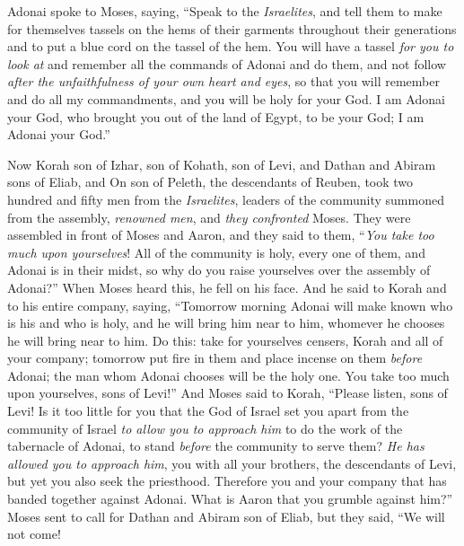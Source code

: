 \begin{biblechapter}
 Adonai spoke to Moses, saying,
\verse “Speak to the \textit{Israelites}, and tell them to make for themselves tassels on the hems of their garments throughout their generations and to put a blue cord on the tassel of the hem.
\verse You will have a tassel \textit{for you to look at} and remember all the commands of Adonai and do them, and not follow \textit{after the unfaithfulness of your own heart and eyes},
\verse so that you will remember and do all my commandments, and you will be holy for your God.
\verse I am Adonai your God, who brought you out of the land of Egypt, to be your God; I am Adonai your God.”
\end{biblechapter}

\begin{biblechapter} %
 Now Korah son of Izhar, son of Kohath, son of Levi, and Dathan and Abiram sons of Eliab, and On son of Peleth, the descendants of Reuben,
\verse took two hundred and fifty men from the \textit{Israelites}, leaders of the community summoned from the assembly, \textit{renowned men}, and \textit{they confronted} Moses.
\verse They were assembled in front of Moses and Aaron, and they said to them, “\textit{You take too much upon yourselves}! All of the community is holy, every one of them, and Adonai is in their midst, so why do you raise yourselves over the assembly of Adonai?”
\verse When Moses heard this, he fell on his face.
\verse And he said to Korah and to his entire company, saying, “Tomorrow morning Adonai will make known who is his and who is holy, and he will bring him near to him, whomever he chooses he will bring near to him.
\verse Do this: take for yourselves censers, Korah and all of your company;
\verse tomorrow put fire in them and place incense on them \textit{before} Adonai; the man whom Adonai chooses will be the holy one. You take too much upon yourselves, sons of Levi!”
\verse And Moses said to Korah, “Please listen, sons of Levi!
\verse Is it too little for you that the God of Israel set you apart from the community of Israel \textit{to allow you to approach him} to do the work of the tabernacle of Adonai, to stand \textit{before} the community to serve them?
\verse \textit{He has allowed you to approach him}, you with all your brothers, the descendants of Levi, but yet you also seek the priesthood.
\verse Therefore you and your company that has banded together against Adonai. What is Aaron that you grumble against him?”
\verse Moses sent to call for Dathan and Abiram son of Eliab, but they said, “We will not come!

\end{biblechapter}
